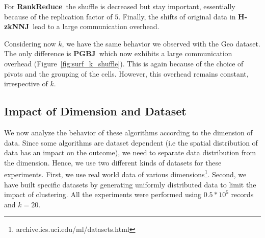 \documentclass[10pt,journal,compsoc]{IEEEtran}
\newcommand{\Z}{{\bf H-zkNNJ}}
\newcommand{\LSH}{{\bf RankReduce}}
\newcommand{\VO}{{\bf PGBJ}}
\begin{document}
For \LSH~the shuffle is decreased but stay important, essentially because of the replication factor of $5$. Finally,
the shifts of original data in \Z~lead to a large communication overhead. 


Considering now $k$, we have the same behavior we observed with the Geo dataset. The only difference is \VO~which now exhibits a
large communication overhead (Figure~\ref{fig:surf_k_shuffle}). This is again because of the choice of pivots and 
the grouping of the cells. However, this overhead remains constant, irrespective of $k$. 


\subsection{Impact of Dimension and Dataset}
We now analyze the behavior of these algorithms according to the dimension of  data. Since 
some algorithms are dataset dependent (i.e the spatial distribution of data has an impact on 
the outcome), we need to separate data distribution from the dimension. Hence, we use two
different kinds of datasets for these experiments. First, we use real world data of various 
dimensions\footnote{archive.ics.uci.edu/ml/datasets.html}. Second, we have built specific datasets by generating 
uniformly distributed data to limit the impact of clustering. All the experiments were performed using 
$0.5*10^5$ records and $k=20$. 
 
 
\end{document}
